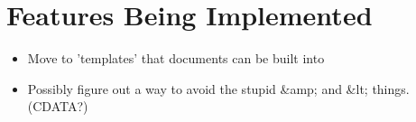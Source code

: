 \section{Features Being Implemented}
  \begin{itemize}
    \item Move to 'templates' that documents can be built into 
    \item Possibly figure out a way to avoid the stupid \&amp; and \&lt; things.
    (CDATA?)
  \end{itemize}